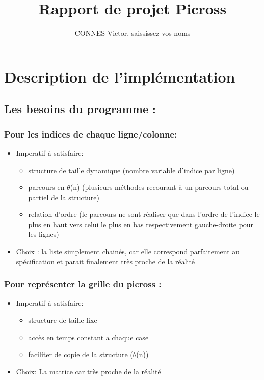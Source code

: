 \documentclass{article}
\begin{document}
\title{Rapport de projet Picross}
\author{CONNES Victor, saississez vos noms}
\maketitle
\tableofcontents
\newpage
\section{Description de l'impl\'ementation}
\subsection{ Les besoins du programme :}

\subsubsection{Pour les indices de chaque ligne/colonne:}
\begin{itemize}
\item Imperatif \`a satisfaire:
\begin{itemize}

\item structure de taille dynamique (nombre variable d’indice par ligne)
\item parcours en $\theta$(n) (plusieurs m\'ethodes recourant \`a  un parcours total ou partiel de la structure)
\item relation d’ordre (le parcours ne sont r\'ealiser que dans l’ordre de l’indice le plus en haut vers celui le plus en bas respectivement gauche-droite pour les
lignes)
\end{itemize}
\item Choix : la liste simplement chain\'es, car elle correspond parfaitement au sp\'ecification et parait finalement tr\`es proche de la r\'ealit\'e
\end{itemize}
\subsubsection{Pour repr\'esenter la grille du picross :}
\begin{itemize}
\item Imperatif \`a satisfaire:
\begin{itemize}
\item structure de taille fixe
\item acc\`es en temps constant a chaque case
\item faciliter de copie de la structure ($\theta$(n))
\end{itemize}
\item Choix: La matrice car tr\`es proche de la r\'ealit\'e
\end{itemize}
\end{document}
